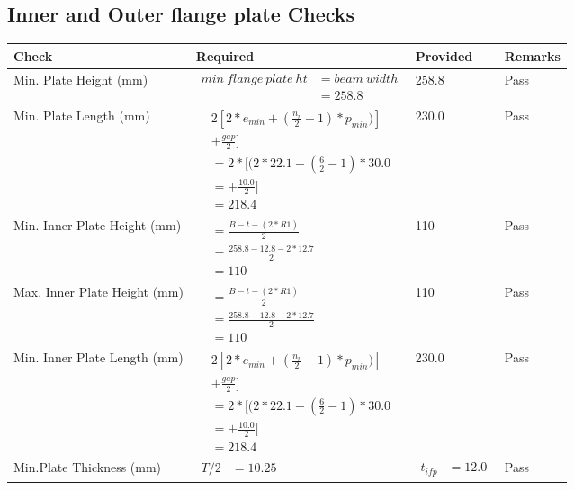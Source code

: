 \documentclass{article}%
\begin{document}
%
\newpage%
\subsection{Inner and Outer flange plate Checks}%
\label{subsec:InnerandOuterflangeplateChecks}%
\renewcommand{\arraystretch}{1.2}%
\begin{longtable}{|p{4cm}|p{6cm}|p{5.5cm}|p{1.5cm}|}%
\hline%
\rowcolor{OsdagGreen}%
Check&Required&Provided&Remarks\\%
\hline%
\endhead%
\hline%
Min. Plate Height (mm)&$\begin{aligned}min~flange~plate~ht &= beam~width\\ &=258.8\end{aligned}$&258.8&Pass\\%
\hline%
Min. Plate Length (mm)&$\begin{aligned} & 2[2*e_{min} + ({\frac{n_r}{2}}-1) * p_{min})]\\ & +\frac{gap}{2}]\\ &=2*[(2*22.1 + (\frac{6}{2}-1) * 30.0\\ &= + \frac{10.0}{2}]\\ &=218.4\end{aligned}$&230.0&Pass\\%
\hline%
Min. Inner Plate Height (mm)&$\begin{aligned}&= \frac{B -t- (2*R1)}{2}\\ &=\frac{258.8 -12.8 - 2*12.7}{2}\\ &=110\end{aligned}$&110&Pass\\%
\hline%
Max. Inner Plate Height (mm)&$\begin{aligned}&= \frac{B -t- (2*R1)}{2}\\ &=\frac{258.8 -12.8 - 2*12.7}{2}\\ &=110\end{aligned}$&110&Pass\\%
\hline%
Min. Inner Plate Length (mm)&$\begin{aligned} & 2[2*e_{min} + ({\frac{n_r}{2}}-1) * p_{min})]\\ & +\frac{gap}{2}]\\ &=2*[(2*22.1 + (\frac{6}{2}-1) * 30.0\\ &= + \frac{10.0}{2}]\\ &=218.4\end{aligned}$&230.0&Pass\\%
\hline%
Min.Plate Thickness (mm)&$\begin{aligned} T/2 &=10.25\end{aligned}$&$\begin{aligned} t_{ifp} &=12.0\end{aligned}$&Pass\\%
\hline%
\end{longtable}
\end{document}
